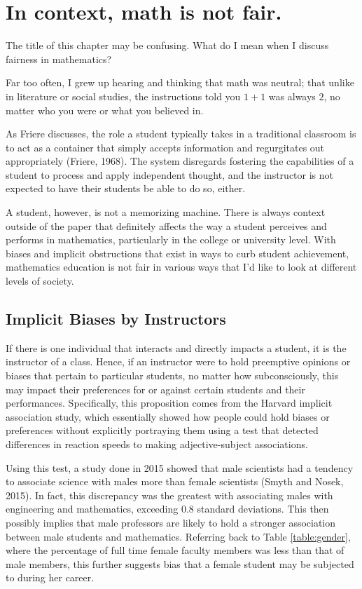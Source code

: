 \chapter{In context, math is not fair.}

The title of this chapter may be confusing. What do I mean when I discuss fairness in mathematics?

Far too often, I grew up hearing and thinking that math was neutral; that unlike in literature or social studies, the instructions told you $1+1$ was always $2$, no matter who you were or what you believed in.

As Friere discusses, the role a student typically takes in a traditional classroom is to act as a container that simply accepts information and regurgitates out appropriately (Friere, 1968). The system disregards fostering the capabilities of a student to process and apply independent thought, and the instructor is not expected to have their students be able to do so, either.

A student, however, is not a memorizing machine. There is always context outside of the paper that definitely affects the way a student perceives and performs in mathematics, particularly in the college or university level. With biases and implicit obstructions that exist in ways to curb student achievement, mathematics education is not fair in various ways that I'd like to look at different levels of society.

\section{Implicit Biases by Instructors}
If there is one individual that interacts and directly impacts a student, it is the instructor of a class. Hence, if an instructor were to hold preemptive opinions or biases that pertain to particular students, no matter how subconsciously, this may impact their preferences for or against certain students and their performances. Specifically, this proposition comes from the Harvard implicit association study, which essentially showed how people could hold biases or preferences without explicitly portraying them using a test that detected differences in reaction speeds to making  adjective-subject associations.

Using this test, a study done in 2015 showed that male scientists had a tendency to associate science with males more than female scientists (Smyth and Nosek, 2015). In fact, this discrepancy was the greatest with associating males with engineering and mathematics, exceeding 0.8 standard deviations. This then possibly implies that male professors are likely to hold a stronger association between male students and mathematics. Referring back to Table \ref{table:gender}, where the percentage of full time female faculty members was less than that of male members, this further suggests bias that a female student may be subjected to during her career.

